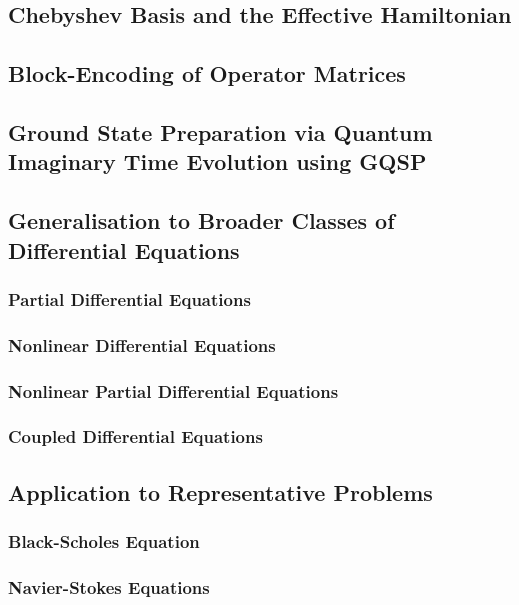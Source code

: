 \subsection{Chebyshev Basis and the Effective Hamiltonian}

\subsection{Block-Encoding of Operator Matrices}

\subsection{Ground State Preparation via Quantum Imaginary Time Evolution using GQSP}

\subsection{Generalisation to Broader Classes of Differential Equations}

\subsubsection{Partial Differential Equations}

\subsubsection{Nonlinear Differential Equations}

\subsubsection{Nonlinear Partial Differential Equations}

\subsubsection{Coupled Differential Equations}

\subsection{Application to Representative Problems}

\subsubsection{Black-Scholes Equation}

\subsubsection{Navier-Stokes Equations}

